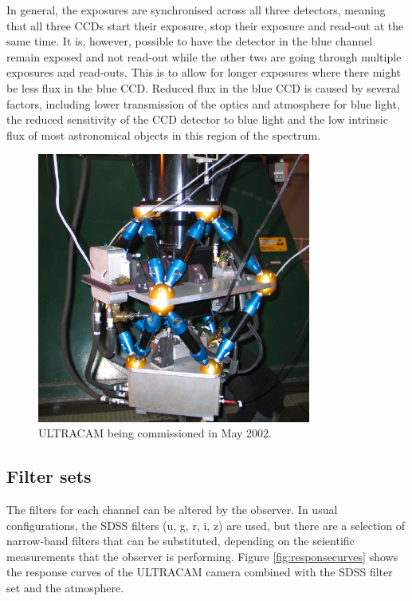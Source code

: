 In general, the exposures are synchronised across all three detectors, meaning that all three CCDs start their exposure, stop their exposure and read-out at the same time. It is, however, possible to have the detector in the blue channel remain exposed and not read-out while the other two are going through multiple exposures and read-outs. This is to allow for longer exposures where there might be less flux in the blue CCD. Reduced flux in the blue CCD is caused by several factors, including lower transmission of the optics and atmosphere for blue light, the reduced sensitivity of the CCD detector to blue light and the low intrinsic flux of most astronomical objects in this region of the spectrum.

\begin{figure}
\centering
\includegraphics[width=90mm]{images/IMG_0121_scaled.JPG}
\caption{ULTRACAM being commissioned in May 2002.}
\label{fig:ultracam}
\end{figure}

\subsection{Filter sets}
The filters for each channel can be altered by the observer. In usual configurations, the SDSS filters (u, g, r, i, z) are used, but there are a selection of narrow-band filters that can be substituted, depending on the scientific measurements that the observer is performing. Figure \ref{fig:responsecurves} shows the response curves of the ULTRACAM camera combined with the SDSS filter set and the atmosphere. 

